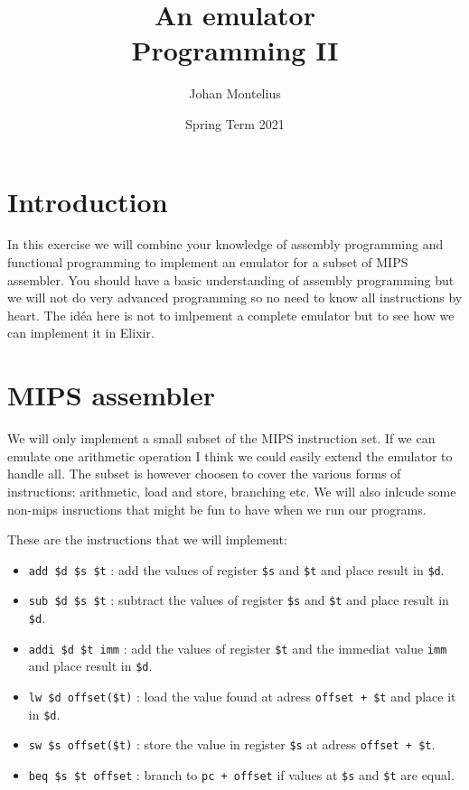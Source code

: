 \documentclass[a4paper,11pt]{article}
\begin{document}
\title{
  \textbf{An emulator}\\
  \large{Programming II}
}
\author{Johan Montelius}
\date{Spring Term 2021}
\maketitle
{}

\section*{Introduction}

In this exercise we will combine your knowledge of assembly
programming and functional programming to implement an emulator for a
subset of MIPS assembler. You should have a basic understanding of
assembly programming but we will not do very advanced programming so
no need to know all instructions by heart. The idéa here is not to
imlpement a complete emulator but to see how we can implement it in
Elixir.


\section{MIPS assembler}

We will only implement a small subset of the MIPS instruction set. If
we can emulate one arithmetic operation I think we could easily extend
the emulator to handle all. The subset is however choosen to cover the
various forms of instructions: arithmetic, load and store, branching
etc. We will also inlcude some non-mips insructions that might be fun
to have when we run our programs.


These are the instructions that we will implement:

\begin{itemize}
\item {\tt add \$d \$s \$t} : add the values of register {\tt \$s} and {\tt \$t} and place result in {\tt \$d}.
\item {\tt  sub \$d \$s \$t} : subtract the values of register {\tt \$s} and {\tt \$t} and place result in {\tt \$d}.
\item {\tt addi \$d \$t imm} : add the values of register {\tt \$t} and the immediat value {\tt imm} and place result in {\tt \$d}.
\item {\tt lw \$d offset(\$t)} : load the value found at adress {\tt offset + \$t} and place it in {\tt \$d}.
\item {\tt sw \$s offset(\$t)} : store the value in register {\tt \$s} at adress {\tt offset + \$t}. 
\item {\tt beq \$s \$t offset} : branch to {\tt pc + offset} if values at {\tt \$s} and  {\tt \$t} are equal.
\end{itemize}
\end{document}
